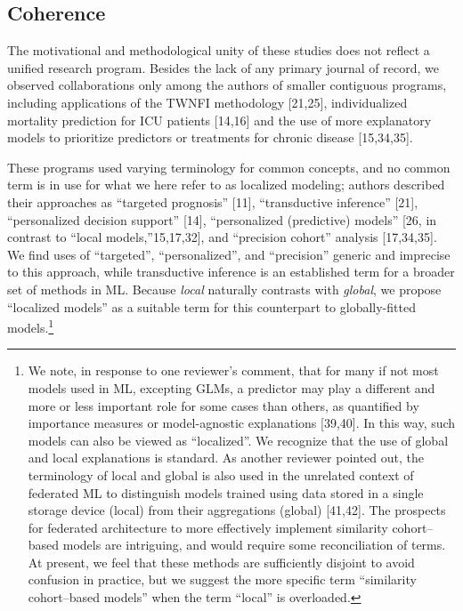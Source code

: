 \documentclass[preprint, 3p,
authoryear]{elsarticle} %
\begin{document}
\hypertarget{coherence}{%
\subsection{Coherence}\label{coherence}}

The motivational and methodological unity of these studies does not
reflect a unified research program. Besides the lack of any primary
journal of record, we observed collaborations only among the authors of
smaller contiguous programs, including applications of the TWNFI
methodology {[}21,25{]}, individualized mortality prediction for ICU
patients {[}14,16{]} and the use of more explanatory models to
prioritize predictors or treatments for chronic disease {[}15,34,35{]}.

These programs used varying terminology for common concepts, and no
common term is in use for what we here refer to as localized modeling;
authors described their approaches as ``targeted prognosis'' {[}11{]},
``transductive inference'' {[}21{]}, ``personalized decision support''
{[}14{]}, ``personalized (predictive) models'' {[}26, in contrast to
``local models,''15,17,32{]}, and ``precision cohort'' analysis
{[}17,34,35{]}. We find uses of ``targeted'', ``personalized'', and
``precision'' generic and imprecise to this approach, while transductive
inference is an established term for a broader set of methods in ML.
Because \emph{local} naturally contrasts with \emph{global}, we propose
``localized models'' as a suitable term for this counterpart to
globally-fitted models.\footnote{We note, in response to one reviewer's
  comment, that for many if not most models used in ML, excepting GLMs,
  a predictor may play a different and more or less important role for
  some cases than others, as quantified by importance measures or
  model-agnostic explanations {[}39,40{]}. In this way, such models can
  also be viewed as ``localized''. We recognize that the use of global
  and local explanations is standard. As another reviewer pointed out,
  the terminology of local and global is also used in the unrelated
  context of federated ML to distinguish models trained using data
  stored in a single storage device (local) from their aggregations
  (global) {[}41,42{]}. The prospects for federated architecture to more
  effectively implement similarity cohort--based models are intriguing,
  and would require some reconciliation of terms. At present, we feel
  that these methods are sufficiently disjoint to avoid confusion in
  practice, but we suggest the more specific term ``similarity
  cohort--based models'' when the term ``local'' is overloaded.}
\end{document}
